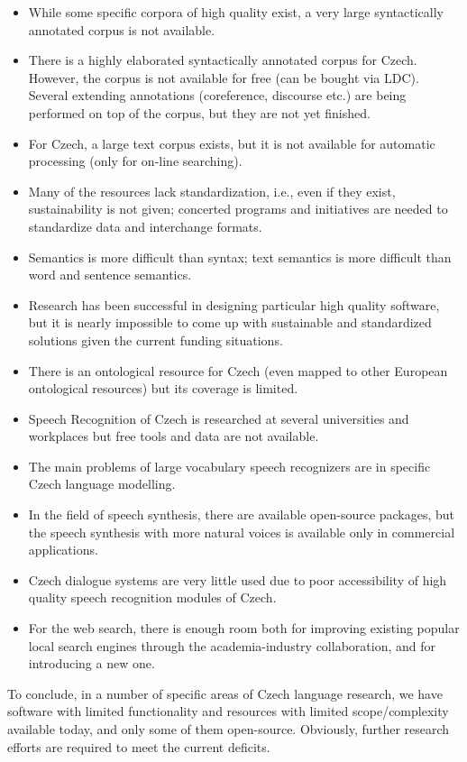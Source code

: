 \documentclass[]{../../metanetpaper}
\begin{document}
\begin{multicols}{2}
\begin{itemize}
\item While some specific corpora of high quality exist, a very large syntactically annotated corpus is not available.
\item There is a highly elaborated syntactically annotated corpus for Czech. However, the corpus is not available for free (can be bought via LDC). Several extending annotations (coreference, discourse etc.) are being performed on top of the corpus, but they are not yet finished.
\item For Czech, a large text corpus exists, but it is not available for automatic processing (only for on-line searching).
\item Many of the resources lack standardization, i.e., even if they exist, sustainability is not given; concerted programs and initiatives are needed to standardize data and interchange formats.
\item Semantics is more difficult than syntax; text semantics is more difficult than word and sentence semantics.
\item Research has been successful in designing particular high quality software, but it is nearly impossible to come up with sustainable and standardized solutions given the current funding situations.
\item There is an ontological resource for Czech (even mapped to other European ontological resources) but its coverage is limited.
\item Speech Recognition of Czech is researched at several universities and workplaces but free tools and data are not available.
\item The main problems of large vocabulary speech recognizers are in specific Czech language modelling.
\item In the field of speech synthesis, there are available open-source packages, but the speech synthesis with more natural voices is available only in commercial applications.
\item Czech dialogue systems are very little used due to poor accessibility of high quality speech recognition modules of Czech.
\item For the web search, there is enough room both for improving existing popular local search engines through the academia-industry collaboration, and for introducing a new one.
\end{itemize}
To conclude, in a number of specific areas of Czech language research, we have software with limited functionality and resources with limited scope/complexity available today, and only some of them open-source. Obviously, further research efforts are required to meet the current deficits.


\end{multicols}
\end{document}
